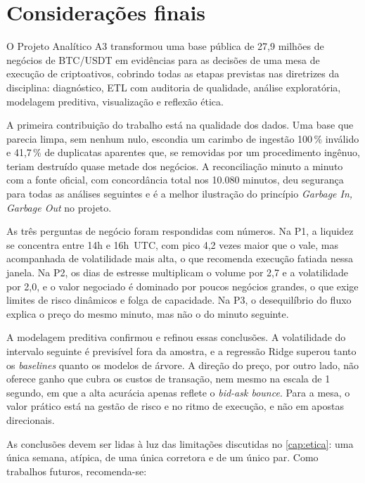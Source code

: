 \chapter{Considerações finais}\label{cap:consideracoes}

O Projeto Analítico A3 transformou uma base pública de 27,9 milhões de negócios
de BTC/USDT em evidências para as decisões de uma mesa de execução de
criptoativos, cobrindo todas as etapas previstas nas diretrizes da disciplina:
diagnóstico, ETL com auditoria de qualidade, análise exploratória, modelagem
preditiva, visualização e reflexão ética.

A primeira contribuição do trabalho está na qualidade dos dados. Uma base que
parecia limpa, sem nenhum nulo, escondia um carimbo de ingestão 100\,\% inválido
e 41,7\,\% de duplicatas aparentes que, se removidas por um procedimento
ingênuo, teriam destruído quase metade dos negócios. A reconciliação minuto a
minuto com a fonte oficial, com concordância total nos 10.080 minutos, deu
segurança para todas as análises seguintes e é a melhor ilustração do princípio
\textit{Garbage In, Garbage Out} no projeto.

As três perguntas de negócio foram respondidas com números. Na P1, a liquidez se
concentra entre 14h e 16h~UTC, com pico 4,2 vezes maior que o vale, mas acompanhada
de volatilidade mais alta, o que recomenda execução fatiada nessa janela. Na P2,
os dias de estresse multiplicam o volume por 2,7 e a volatilidade por 2,0, e o
valor negociado é dominado por poucos negócios grandes, o que exige limites de
risco dinâmicos e folga de capacidade. Na P3, o desequilíbrio do fluxo explica o
preço do mesmo minuto, mas não o do minuto seguinte.

A modelagem preditiva confirmou e refinou essas conclusões. A volatilidade do
intervalo seguinte é previsível fora da amostra, e a regressão Ridge superou
tanto os \textit{baselines} quanto os modelos de árvore. A direção do preço, por
outro lado, não oferece ganho que cubra os custos de transação, nem mesmo na
escala de 1 segundo, em que a alta acurácia apenas reflete o \textit{bid-ask
bounce}. Para a mesa, o valor prático está na gestão de risco e no ritmo de
execução, e não em apostas direcionais.

As conclusões devem ser lidas à luz das limitações discutidas no
\autoref{cap:etica}: uma única semana, atípica, de uma única corretora e de um
único par. Como trabalhos futuros, recomenda-se:

